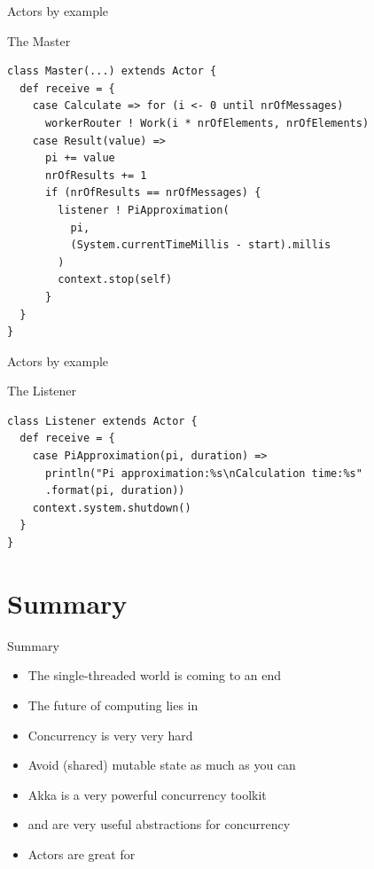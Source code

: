 \begin{frame}[fragile]{Actors by example}
\begin{exampleblock}{The Master}
\begin{lstlisting}
class Master(...) extends Actor {
  def receive = {
    case Calculate => for (i <- 0 until nrOfMessages)
      workerRouter ! Work(i * nrOfElements, nrOfElements)
    case Result(value) =>
      pi += value
      nrOfResults += 1
      if (nrOfResults == nrOfMessages) {
        listener ! PiApproximation(
          pi,
          (System.currentTimeMillis - start).millis
        )
        context.stop(self)
      }
  }
}
\end{lstlisting}
\end{exampleblock}
\end{frame}

\begin{frame}[fragile]{Actors by example}
\begin{exampleblock}{The Listener}
\begin{lstlisting}
class Listener extends Actor {
  def receive = {
    case PiApproximation(pi, duration) =>
      println("Pi approximation:%s\nCalculation time:%s"
      .format(pi, duration))
    context.system.shutdown()
  }
}
\end{lstlisting}
\end{exampleblock}
\end{frame}

\section{Summary}
\begin{frame}{Summary}
\begin{itemize}
  \item The \alert{single-threaded} world is coming to an end
  \item The future of computing lies in 
  \item Concurrency is very very \alert{hard}
  \item \alert{Avoid} (shared) mutable state as much as you can
  \item Akka is a very powerful  concurrency toolkit
  \item {} and  are very useful abstractions for concurrency
  \item Actors are great for 
\end{itemize}
\end{frame}
